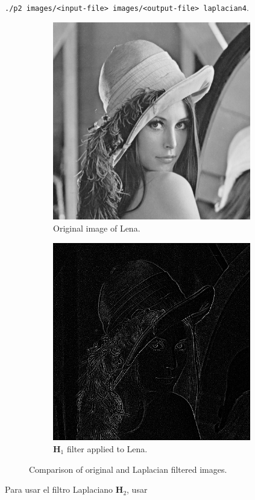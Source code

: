 \documentclass{article}
\theoremstyle{problemstyle}
\begin{document}
\begin{problem}
\begin{enumerate}[a)]
\texttt{./p2 images/<input-file> images/<output-file> laplacian4}.
	      \begin{figure}[H]
		      \begin{subfigure}{.45\textwidth}
			      \centering
			      \includegraphics[width=0.95\textwidth]{lena_ascii.png}
			      \caption{Original image of Lena.}
		      \end{subfigure}
		      \hfill
		      \begin{subfigure}{.45\textwidth}
			      \centering
			      \includegraphics[width=0.95\textwidth]{lena_laplacian4.png}
			      \caption{$ \mathbf{H}_1 $ filter applied to Lena.}
			      \label{fig:lena_laplacian4}
		      \end{subfigure}
		      \caption{Comparison of original and Laplacian filtered images.}
	      \end{figure}
Para usar el filtro Laplaciano $ \mathbf{H}_2 $, usar



\end{enumerate}
\end{problem}
\end{document}
